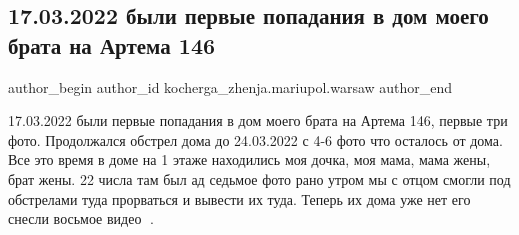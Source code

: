  
 
 
 
 

\subsection{17.03.2022 были первые попадания в дом моего брата на Артема 146}
\label{sec:17_03_2023.fb.kocherga_zhenja.mariupol.warsaw.1.popadania_v_dom_moego_brata_artema_146}

\ifcmt
 author_begin
   author_id kocherga_zhenja.mariupol.warsaw
 author_end
\fi

17.03.2022 были первые попадания в дом моего брата на Артема 146, первые три
фото. Продолжался обстрел дома до 24.03.2022 с 4-6 фото что осталось от дома. Все
это время в доме на 1 этаже находились моя дочка, моя мама, мама жены, брат
жены. 22 числа там был ад седьмое фото рано утром мы с отцом смогли под
обстрелами туда прорваться и вывести их туда. Теперь их дома уже нет его снесли
восьмое видео 🫣.

